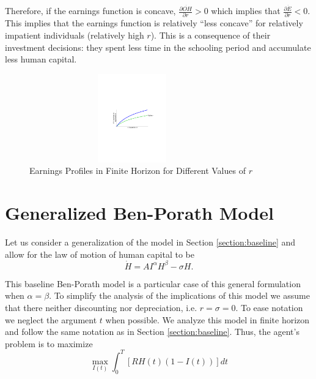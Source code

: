 \indent Therefore, if the earnings function is concave, $\frac{\partial \dot{OH}}{\partial r} > 0$ which implies that $\frac{\partial \dot{E}}{\partial r} < 0$. This implies that the earnings function is relatively ``less concave'' for relatively impatient individuals (relatively high $r$). This is a consequence of their investment decisions: they spent less time in the schooling period and accumulate less human capital.

\begin{center}
\begin{figure}[H]
\caption{Earnings Profiles in Finite Horizon for Different Values of $r$ }
\centering
\includegraphics[width=3.5in, height=1.5in]{Figures/fig-earnings-growth.pdf}
\end{figure}
\end{center}
 
\section{Generalized Ben-Porath Model} \label{section:generalized}
Let us consider a generalization of the model in Section \ref{section:baseline} and allow for the law of motion of human capital to be
\begin{equation}
\dot{H} = A I^{\alpha} H^{\beta} - \sigma H \label{eq:lawhgen}.
\end{equation}

\indent This baseline Ben-Porath model is a particular case of this general formulation when $\alpha = \beta$. To simplify the analysis of the implications of this model we assume that there neither discounting nor depreciation, i.e. $r = \sigma = 0$. To ease notation we neglect the argument $t$ when possible. We analyze this model in finite horizon and follow the same notation as in Section \ref{section:baseline}. Thus, the agent's problem is to maximize
\begin{equation}
\max_{I(t)} \int _{0} ^{T} \left[ RH(t) \left(1 - I(t) \right) \right]dt
\end{equation}

